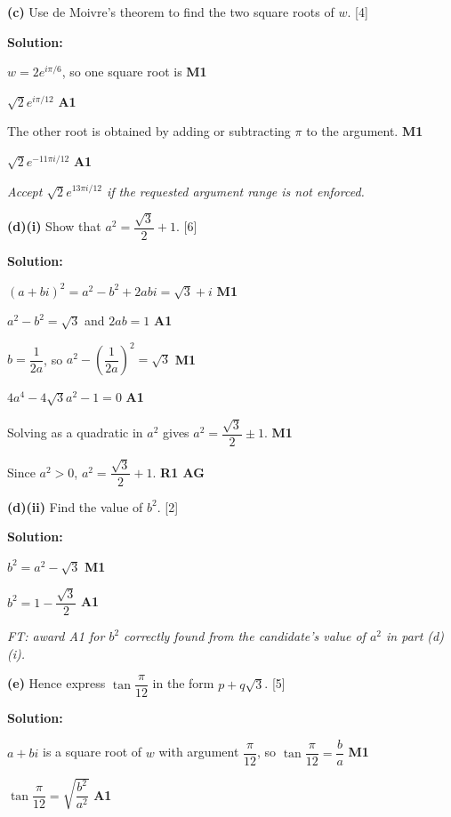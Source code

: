 \documentclass[12pt, twoside]{article}
\begin{document}
\begin{enumerate}[itemsep=0.3cm]
\textbf{(c)} Use de Moivre's theorem to find the two square roots of $w$. \hfill [4]

\textbf{Solution:}

$w = 2e^{i\pi/6}$, so one square root is \hfill \textbf{M1}

$\sqrt{2}e^{i\pi/12}$ \hfill \textbf{A1}

The other root is obtained by adding or subtracting $\pi$ to the argument. \hfill \textbf{M1}

$\sqrt{2}e^{-11\pi i/12}$ \hfill \textbf{A1}

\emph{Accept $\sqrt{2}e^{13\pi i/12}$ if the requested argument range is not enforced.}

\medskip

\textbf{(d)(i)} Show that $a^2 = \dfrac{\sqrt{3}}{2} + 1$. \hfill [6]

\textbf{Solution:}

$(a + bi)^2 = a^2 - b^2 + 2abi = \sqrt{3} + i$ \hfill \textbf{M1}

$a^2 - b^2 = \sqrt{3}$ and $2ab = 1$ \hfill \textbf{A1}

$b = \dfrac{1}{2a}$, so
$a^2 - \left(\dfrac{1}{2a}\right)^2 = \sqrt{3}$ \hfill \textbf{M1}

$4a^4 - 4\sqrt{3}a^2 - 1 = 0$ \hfill \textbf{A1}

Solving as a quadratic in $a^2$ gives
$a^2 = \dfrac{\sqrt{3}}{2} \pm 1$. \hfill \textbf{M1}

Since $a^2 > 0$, $a^2 = \dfrac{\sqrt{3}}{2} + 1$. \hfill \textbf{R1 AG}

\medskip

\textbf{(d)(ii)} Find the value of $b^2$. \hfill [2]

\textbf{Solution:}

$b^2 = a^2 - \sqrt{3}$ \hfill \textbf{M1}

$b^2 = 1 - \dfrac{\sqrt{3}}{2}$ \hfill \textbf{A1}

\emph{FT: award A1 for $b^2$ correctly found from the candidate's value of $a^2$ in part (d)(i).}

\medskip

\textbf{(e)} Hence express $\tan\dfrac{\pi}{12}$ in the form $p + q\sqrt{3}$. \hfill [5]

\textbf{Solution:}

$a + bi$ is a square root of $w$ with argument $\dfrac{\pi}{12}$, so
$\tan\dfrac{\pi}{12} = \dfrac{b}{a}$ \hfill \textbf{M1}

$\tan\dfrac{\pi}{12} = \sqrt{\dfrac{b^2}{a^2}}$ \hfill \textbf{A1}


\end{enumerate}
\end{document}
